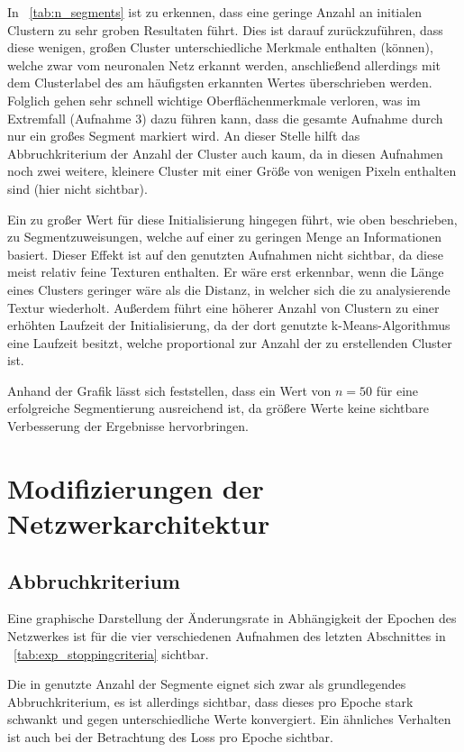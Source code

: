 In \tablename~\ref{tab:n_segments} ist zu erkennen, dass eine geringe Anzahl an initialen Clustern zu sehr groben Resultaten führt. Dies ist darauf zurückzuführen, dass diese wenigen, großen Cluster unterschiedliche Merkmale enthalten (können), welche zwar vom neuronalen Netz erkannt werden, anschließend allerdings mit dem Clusterlabel des am häufigsten erkannten Wertes überschrieben werden. Folglich gehen sehr schnell wichtige Oberflächenmerkmale verloren, was im Extremfall (\vgl Aufnahme 3) dazu führen kann, dass die gesamte Aufnahme durch nur ein großes Segment markiert wird. An dieser Stelle hilft das Abbruchkriterium der Anzahl der Cluster auch kaum, da in diesen Aufnahmen noch zwei weitere, kleinere Cluster mit einer Größe von wenigen Pixeln enthalten sind (hier nicht sichtbar).

Ein zu großer Wert für diese Initialisierung hingegen führt, wie oben beschrieben, zu Segmentzuweisungen, welche auf einer zu geringen Menge an Informationen basiert. Dieser Effekt ist auf den genutzten Aufnahmen nicht sichtbar, da diese meist relativ feine Texturen enthalten. Er wäre erst erkennbar, wenn die Länge eines Clusters geringer wäre als die Distanz, in welcher sich die zu analysierende Textur wiederholt. Außerdem führt eine höherer Anzahl von Clustern zu einer erhöhten Laufzeit der Initialisierung, da der dort genutzte k-Means-Algorithmus eine Laufzeit besitzt, welche proportional zur Anzahl der zu erstellenden Cluster ist.

Anhand der Grafik lässt sich feststellen, dass ein Wert von $n=50$ für eine erfolgreiche Segmentierung ausreichend ist, da größere Werte keine sichtbare Verbesserung der Ergebnisse hervorbringen.

\section{Modifizierungen der Netzwerkarchitektur}

\subsection{Abbruchkriterium}
\label{ssec:exp_stoppingcriteria}

Eine graphische Darstellung der Änderungsrate in Abhängigkeit der Epochen des Netzwerkes ist für die vier verschiedenen Aufnahmen des letzten Abschnittes in \tablename~\ref{tab:exp_stoppingcriteria} sichtbar.

Die in \cite{kanezaki_18} genutzte Anzahl der Segmente eignet sich zwar als grundlegendes Abbruchkriterium, es ist allerdings sichtbar, dass dieses pro Epoche stark schwankt und gegen unterschiedliche Werte konvergiert. Ein ähnliches Verhalten ist auch bei der Betrachtung des Loss pro Epoche sichtbar.

